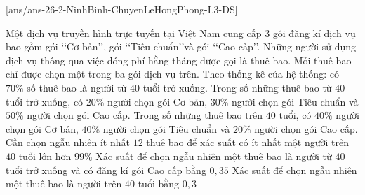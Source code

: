 \cauds
{}[ans/ans-26-2-NinhBinh-ChuyenLeHongPhong-L3-DS]
\begin{ex}%
	Một dịch vụ truyền hình trực tuyến tại Việt Nam cung cấp $3$ gói đăng kí dịch vụ bao gồm gói \lq\lq Cơ bản\rq\rq, gói \lq\lq Tiêu chuẩn\rq\rq và gói \lq\lq Cao cấp\rq\rq. Những người sử dụng dịch vụ thông qua việc đóng phí hằng tháng được gọi là thuê bao. Mỗi thuê bao chỉ được chọn một trong ba gói dịch vụ trên. Theo thống kê của hệ thống: có $70\%$ số thuê bao là người từ $40$ tuổi trở xuống. Trong số những thuê bao từ $40$ tuổi trở xuống, có $20\%$ người chọn gói Cơ bản, $30\%$ người chọn gói Tiêu chuẩn và $50\%$ người chọn gói Cao cấp. Trong số những thuê bao trên $40$ tuổi, có $40\%$ người chọn gói Cơ bản, $40\%$ người chọn gói Tiêu chuẩn và $20\%$ người chọn gói Cao cấp.
	{Cần chọn ngẫu nhiên ít nhất $12$ thuê bao để xác suất có ít nhất một người trên $40$ tuổi lớn hơn $99\%$}
	{\True Xác suất để chọn ngẫu nhiên một thuê bao là người từ $40$ tuổi trở xuống và có đăng kí gói Cao cấp bằng $0{,}35$}
	{\True Xác suất để chọn ngẫu nhiên một thuê bao là người trên $40$ tuổi bằng $0{,}3$}
\end{ex}
